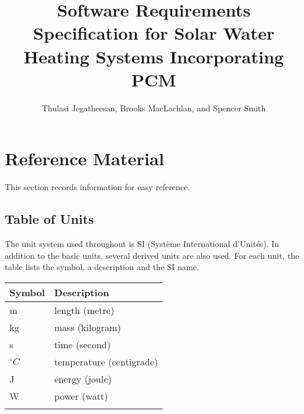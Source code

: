 \documentclass[12pt]{article}
\title{Software Requirements Specification for Solar Water Heating Systems Incorporating PCM}
\author{Thulasi Jegatheesan, Brooks MacLachlan, and Spencer Smith}
\begin{document}
\maketitle
\tableofcontents
\newpage
\section{Reference Material}
\label{Sec:RefeMate}
This section records information for easy reference.
\subsection{Table of Units}
\label{Sec:TablofUnit}
The unit system used throughout is SI (Syst\`{e}me International d'Unit\'{e}s). In addition to the basic units, several derived units are also used. For each unit, the table lists the symbol, a description and the SI name.
\begin{longtable*}{l l}
\toprule
Symbol & Description
\\
\midrule
m & length (metre)
\\
kg & mass (kilogram)
\\
s & time (second)
\\
${}^{\circ}C$ & temperature (centigrade)
\\
J & energy (joule)
\\
W & power (watt)
\\
\bottomrule
\label{Table:TablofUnit}
\end{longtable*}
\end{document}
